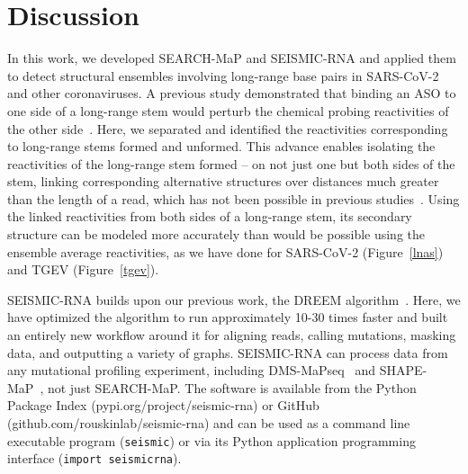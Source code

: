 \documentclass[main.tex]{subfiles}
\begin{document}
\section{Discussion}

In this work, we developed SEARCH-MaP and SEISMIC-RNA and applied them to detect structural ensembles involving long-range base pairs in SARS-CoV-2 and other coronaviruses.
A previous study demonstrated that binding an ASO to one side of a long-range stem would perturb the chemical probing reactivities of the other side~\cite{Archer2013}.
Here, we separated and identified the reactivities corresponding to long-range stems formed and unformed.
This advance enables isolating the reactivities of the long-range stem formed -- on not just one but both sides of the stem, linking corresponding alternative structures over distances much greater than the length of a read, which has not been possible in previous studies~\cite{Tomezsko2020,Morandi2021}.
Using the linked reactivities from both sides of a long-range stem, its secondary structure can be modeled more accurately than would be possible using the ensemble average reactivities, as we have done for SARS-CoV-2 (Figure~\ref{lnas}) and TGEV (Figure~\ref{tgev}).

SEISMIC-RNA builds upon our previous work, the DREEM algorithm~\cite{Tomezsko2020}.
Here, we have optimized the algorithm to run approximately 10-30 times faster and built an entirely new workflow around it for aligning reads, calling mutations, masking data, and outputting a variety of graphs.
SEISMIC-RNA can process data from any mutational profiling experiment, including DMS-MaPseq~\cite{Zubradt2016} and SHAPE-MaP~\cite{Siegfried2014}, not just SEARCH-MaP.
The software is available from the Python Package Index (pypi.org/project/seismic-rna) or GitHub (github.com/rouskinlab/seismic-rna) and can be used as a command line executable program (\verb|seismic|) or via its Python application programming interface (\verb|import seismicrna|).
\end{document}
